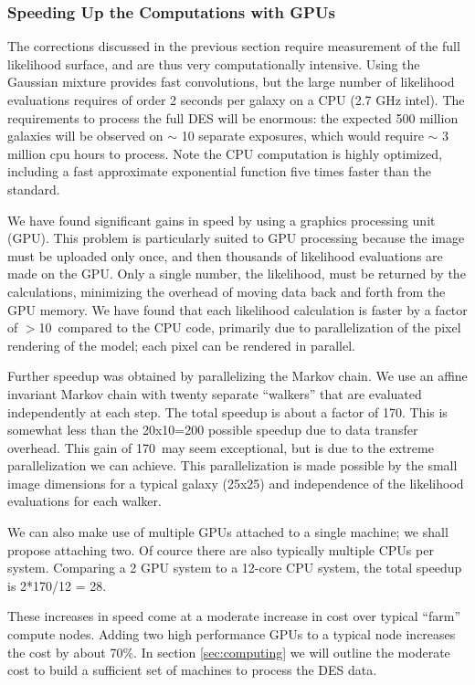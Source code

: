\documentclass[12pt]{article}
\newcommand{\speedupnum}{10}
\newcommand{\overallspeedup}{170}
\begin{document}
\subsubsection{Speeding Up the Computations with GPUs} \label{sec:gmix:gpu}

The corrections discussed in the previous section require measurement of the
full likelihood surface, and are thus very computationally intensive.  Using
the Gaussian mixture provides fast convolutions, but the large number of
likelihood evaluations requires of order 2 seconds per galaxy on a CPU (2.7 GHz
intel). The requirements to process the full DES will be enormous: the expected
500 million galaxies will be observed on $\sim$ 10 separate exposures, which
would require $\sim$ 3 million cpu hours to process. Note the CPU computation
is highly optimized, including a fast approximate exponential function five
times faster than the standard. 

We have found significant gains in speed by using a graphics processing unit
(GPU).  This problem is particularly suited to GPU processing because the image
must be uploaded only once, and then thousands of likelihood evaluations are
made on the GPU. Only a single number, the likelihood, must be returned by the
calculations, minimizing the overhead of moving data back and forth from the
GPU memory.  We have found that each likelihood calculation is faster by a
factor of $>$\speedupnum\ compared to the CPU code, primarily due to
parallelization of the pixel rendering of the model; each pixel can be rendered
in parallel.

Further speedup was obtained by parallelizing the Markov chain.  We use an
affine invariant Markov chain\cite{GoodmanWeare10} with twenty separate
``walkers'' that are evaluated independently at each step.  The total speedup
is about a factor of \overallspeedup.  This is somewhat less than the 20x10=200
possible speedup due to data transfer overhead.  This gain of \overallspeedup\
may seem exceptional, but is due to the extreme parallelization we can achieve.
This parallelization is made possible by the small image dimensions for a
typical galaxy (25x25) and independence of the likelihood evaluations for each
walker.

We can also make use of multiple GPUs attached to a single machine; we shall
propose attaching two.  Of cource there are also typically multiple CPUs per
system.  Comparing a 2 GPU system to a 12-core CPU system, the total speedup is
2*170/12 = 28.

These increases in speed come at a moderate increase in cost over typical
``farm'' compute nodes.  Adding two high performance GPUs to a typical node
increases the cost by about 70\%. In section \ref{sec:computing} we will
outline the moderate cost to build a sufficient set of machines to process the
DES data.
\end{document}
